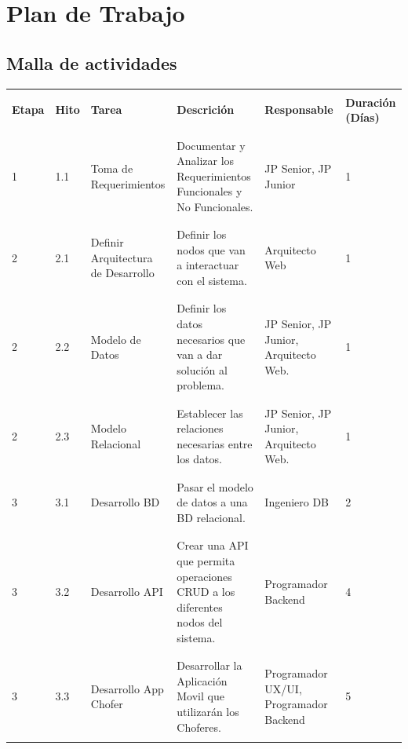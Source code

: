 \documentclass[12pt]{article}
\begin{document}
\section{Plan de Trabajo}
\subsection{Malla de actividades}
\begin{table}[!h]
    \centering
    \begin{tabular}{|p{1.2cm}|p{1cm}|p{2cm}|p{5cm}|p{3cm}|p{2cm}|}
         \hline
         &&&&&\\
         \textbf{Etapa} & \textbf{Hito} & \textbf{Tarea} & \textbf{Descrición} & \textbf{Responsable} & \textbf{Duración (Días)}  \\
         &&&&&\\
         \hline
         &&&&&\\
         1 & 1.1 & Toma de Requerimientos & Documentar y Analizar los Requerimientos Funcionales y No Funcionales. & JP Senior, JP Junior & 1 \\
         &&&&&\\
         \hline
         &&&&&\\
         2 & 2.1 & Definir Arquitectura de Desarrollo & Definir los nodos que van a interactuar con el sistema. & Arquitecto Web & 1 \\
         &&&&&\\
         \hline
         &&&&&\\
         2 & 2.2 & Modelo de Datos & Definir los datos necesarios que van a dar solución al problema. & JP Senior, JP Junior, Arquitecto Web. &1 \\
         &&&&&\\
         \hline
         &&&&&\\
         2 & 2.3 & Modelo Relacional & Establecer las relaciones necesarias entre los datos. & JP Senior, JP Junior, Arquitecto Web. & 1\\
         &&&&&\\
         \hline
         &&&&&\\
         3 & 3.1 & Desarrollo BD & Pasar el modelo de datos a una BD relacional. & Ingeniero DB & 2 \\
         &&&&&\\
         \hline
         &&&&&\\
         3 & 3.2 & Desarrollo API & Crear una API que permita operaciones CRUD a los diferentes nodos del sistema. & Programador Backend & 4 \\
         &&&&&\\
         \hline
         &&&&&\\
         3 & 3.3 & Desarrollo App Chofer & Desarrollar la Aplicación Movil que utilizarán los Choferes. & Programador UX/UI, Programador Backend & 5 \\
         &&&&&\\
         \hline
    \end{tabular} 
\end{table}
\end{document}
